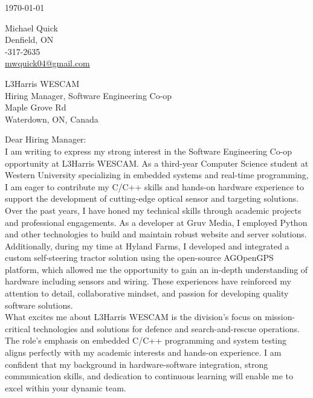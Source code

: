 \documentclass[11pt]{article}
\begin{document}
\begin{flushright}
\today
\end{flushright}

\noindent Michael Quick \\
\noindent Denfield, ON \\
-317-2635 \\
\noindent \href{mailto:mwquick04@gmail.com}{mwquick04@gmail.com} \\

\vspace{1em}

\noindent L3Harris WESCAM \\
\noindent Hiring Manager, Software Engineering Co-op \\
 Maple Grove Rd \\
\noindent Waterdown, ON, Canada\\

\vspace{1em}

\noindent Dear Hiring Manager:\\

I am writing to express my strong interest in the Software Engineering Co-op opportunity at L3Harris WESCAM. As a third-year Computer Science student at Western University specializing in embedded systems and real-time programming, I am eager to contribute my C/C++ skills and hands-on hardware experience to support the development of cutting-edge optical sensor and targeting solutions.\\

Over the past years, I have honed my technical skills through academic projects and professional engagements. As a developer at Gruv Media, I employed Python and other technologies to build and maintain robust website and server solutions. Additionally, during my time at Hyland Farms, I developed and integrated a custom self-steering tractor solution using the open-source AGOpenGPS platform, which allowed me the opportunity to gain an in-depth understanding of hardware including sensors and wiring. These experiences have reinforced my attention to detail, collaborative mindset, and passion for developing quality software solutions.\\

What excites me about L3Harris WESCAM is the division’s focus on mission-critical technologies and solutions for defence and search-and-rescue operations. The role’s emphasis on embedded C/C++ programming and system testing aligns perfectly with my academic interests and hands-on experience. I am confident that my background in hardware-software integration, strong communication skills, and dedication to continuous learning will enable me to excel within your dynamic team.\\
\end{document}

